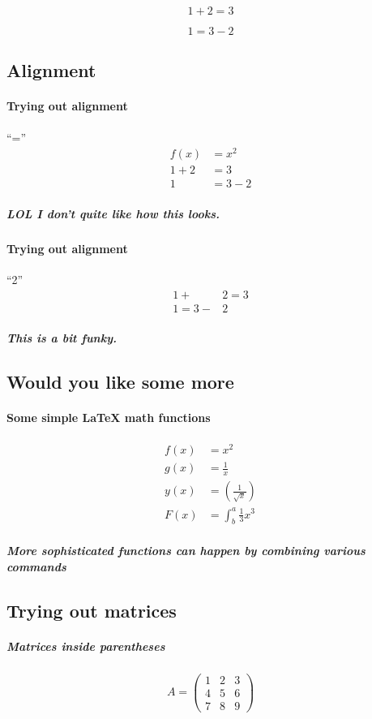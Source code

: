 \documentclass[a4paper, 12pt]{article}
\begin{document}
\begin{equation*}
  1 + 2 = 3 
\end{equation*}

\begin{equation*}
  1 = 3 - 2
\end{equation*}

\subsection{Alignment}
\paragraph{Trying out alignment} ``=''
\begin{align*}
    f(x) &= x^2\\
    1 + 2 &= 3\\
  1 &= 3 - 2
\end{align*}
\subparagraph{LOL I don't quite like how this looks.}

\paragraph{Trying out alignment} ``2''
\begin{align*}
    1 + &2 = 3\\
  1 = 3 - &2
\end{align*}
\subparagraph{This is a bit funky.}


\subsection{Would you like some more}
\paragraph{Some simple LaTeX math functions}
\begin{align*}
  f(x) &= x^2\\
  g(x) &= \frac{1}{x}\\
  y(x) &= \left(\frac{1}{\sqrt{x}}\right)\\
  F(x) &= \int^a_b \frac{1}{3}x^3
\end{align*}
\subparagraph{More sophisticated functions can happen by combining various commands}



\subsection{Trying out matrices}
\subparagraph{Matrices inside parentheses}
\begin{equation*}
A = 
\begin{pmatrix}
1 & 2 & 3 \\
4 & 5 & 6 \\
7 & 8 & 9
\end{pmatrix}
\end{equation*}
\end{document}
